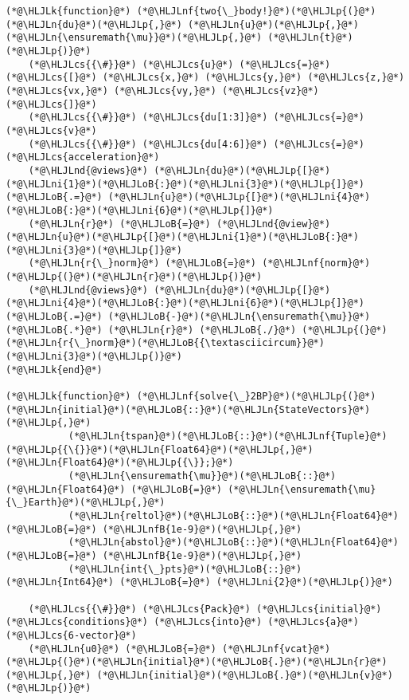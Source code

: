 \documentclass[12pt,a4paper]{article}
\newcommand{\HLJLk}[1]{\textcolor[RGB]{148,91,176}{\textbf{#1}}}
\newcommand{\HLJLn}[1]{#1}
\newcommand{\HLJLnd}[1]{\textcolor[RGB]{214,102,97}{#1}}
\newcommand{\HLJLnf}[1]{\textcolor[RGB]{66,102,213}{#1}}
\newcommand{\HLJLnfB}[1]{\textcolor[RGB]{59,151,46}{#1}}
\newcommand{\HLJLni}[1]{\textcolor[RGB]{59,151,46}{#1}}
\newcommand{\HLJLoB}[1]{\textcolor[RGB]{102,102,102}{\textbf{#1}}}
\newcommand{\HLJLp}[1]{#1}
\newcommand{\HLJLcs}[1]{\textcolor[RGB]{153,153,119}{\textit{#1}}}
\begin{document}
\begin{lstlisting}
(*@\HLJLk{function}@*) (*@\HLJLnf{two{\_}body!}@*)(*@\HLJLp{(}@*)(*@\HLJLn{du}@*)(*@\HLJLp{,}@*) (*@\HLJLn{u}@*)(*@\HLJLp{,}@*) (*@\HLJLn{\ensuremath{\mu}}@*)(*@\HLJLp{,}@*) (*@\HLJLn{t}@*)(*@\HLJLp{)}@*)
	(*@\HLJLcs{{\#}}@*) (*@\HLJLcs{u}@*) (*@\HLJLcs{=}@*) (*@\HLJLcs{[}@*) (*@\HLJLcs{x,}@*) (*@\HLJLcs{y,}@*) (*@\HLJLcs{z,}@*) (*@\HLJLcs{vx,}@*) (*@\HLJLcs{vy,}@*) (*@\HLJLcs{vz}@*) (*@\HLJLcs{]}@*)
	(*@\HLJLcs{{\#}}@*) (*@\HLJLcs{du[1:3]}@*) (*@\HLJLcs{=}@*) (*@\HLJLcs{v}@*)
	(*@\HLJLcs{{\#}}@*) (*@\HLJLcs{du[4:6]}@*) (*@\HLJLcs{=}@*) (*@\HLJLcs{acceleration}@*)
	(*@\HLJLnd{@views}@*) (*@\HLJLn{du}@*)(*@\HLJLp{[}@*)(*@\HLJLni{1}@*)(*@\HLJLoB{:}@*)(*@\HLJLni{3}@*)(*@\HLJLp{]}@*) (*@\HLJLoB{.=}@*) (*@\HLJLn{u}@*)(*@\HLJLp{[}@*)(*@\HLJLni{4}@*)(*@\HLJLoB{:}@*)(*@\HLJLni{6}@*)(*@\HLJLp{]}@*)
	(*@\HLJLn{r}@*) (*@\HLJLoB{=}@*) (*@\HLJLnd{@view}@*) (*@\HLJLn{u}@*)(*@\HLJLp{[}@*)(*@\HLJLni{1}@*)(*@\HLJLoB{:}@*)(*@\HLJLni{3}@*)(*@\HLJLp{]}@*)
	(*@\HLJLn{r{\_}norm}@*) (*@\HLJLoB{=}@*) (*@\HLJLnf{norm}@*)(*@\HLJLp{(}@*)(*@\HLJLn{r}@*)(*@\HLJLp{)}@*)
	(*@\HLJLnd{@views}@*) (*@\HLJLn{du}@*)(*@\HLJLp{[}@*)(*@\HLJLni{4}@*)(*@\HLJLoB{:}@*)(*@\HLJLni{6}@*)(*@\HLJLp{]}@*) (*@\HLJLoB{.=}@*) (*@\HLJLoB{-}@*)(*@\HLJLn{\ensuremath{\mu}}@*) (*@\HLJLoB{.*}@*) (*@\HLJLn{r}@*) (*@\HLJLoB{./}@*) (*@\HLJLp{(}@*)(*@\HLJLn{r{\_}norm}@*)(*@\HLJLoB{{\textasciicircum}}@*)(*@\HLJLni{3}@*)(*@\HLJLp{)}@*)
(*@\HLJLk{end}@*)

(*@\HLJLk{function}@*) (*@\HLJLnf{solve{\_}2BP}@*)(*@\HLJLp{(}@*)(*@\HLJLn{initial}@*)(*@\HLJLoB{::}@*)(*@\HLJLn{StateVectors}@*)(*@\HLJLp{,}@*)
		   (*@\HLJLn{tspan}@*)(*@\HLJLoB{::}@*)(*@\HLJLnf{Tuple}@*)(*@\HLJLp{{\{}}@*)(*@\HLJLn{Float64}@*)(*@\HLJLp{,}@*) (*@\HLJLn{Float64}@*)(*@\HLJLp{{\}};}@*)
		   (*@\HLJLn{\ensuremath{\mu}}@*)(*@\HLJLoB{::}@*)(*@\HLJLn{Float64}@*) (*@\HLJLoB{=}@*) (*@\HLJLn{\ensuremath{\mu}{\_}Earth}@*)(*@\HLJLp{,}@*)
		   (*@\HLJLn{reltol}@*)(*@\HLJLoB{::}@*)(*@\HLJLn{Float64}@*) (*@\HLJLoB{=}@*) (*@\HLJLnfB{1e-9}@*)(*@\HLJLp{,}@*)
		   (*@\HLJLn{abstol}@*)(*@\HLJLoB{::}@*)(*@\HLJLn{Float64}@*) (*@\HLJLoB{=}@*) (*@\HLJLnfB{1e-9}@*)(*@\HLJLp{,}@*)
		   (*@\HLJLn{int{\_}pts}@*)(*@\HLJLoB{::}@*)(*@\HLJLn{Int64}@*) (*@\HLJLoB{=}@*) (*@\HLJLni{2}@*)(*@\HLJLp{)}@*)

	(*@\HLJLcs{{\#}}@*) (*@\HLJLcs{Pack}@*) (*@\HLJLcs{initial}@*) (*@\HLJLcs{conditions}@*) (*@\HLJLcs{into}@*) (*@\HLJLcs{a}@*) (*@\HLJLcs{6‐vector}@*)
	(*@\HLJLn{u0}@*) (*@\HLJLoB{=}@*) (*@\HLJLnf{vcat}@*)(*@\HLJLp{(}@*)(*@\HLJLn{initial}@*)(*@\HLJLoB{.}@*)(*@\HLJLn{r}@*)(*@\HLJLp{,}@*) (*@\HLJLn{initial}@*)(*@\HLJLoB{.}@*)(*@\HLJLn{v}@*)(*@\HLJLp{)}@*)


\end{lstlisting}
\end{document}
